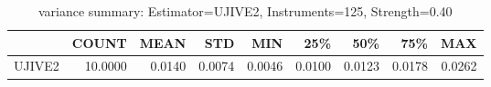 \begin{table}[ht]
\centering
\caption{variance summary: Estimator=UJIVE2, Instruments=125, Strength=0.40}
\begin{tabular}{lrrrrrrrr}
\toprule
 & COUNT & MEAN & STD & MIN & 25\% & 50\% & 75\% & MAX \\
\midrule
UJIVE2 & 10.0000 & 0.0140 & 0.0074 & 0.0046 & 0.0100 & 0.0123 & 0.0178 & 0.0262 \\
\bottomrule
\end{tabular}
\end{table}
